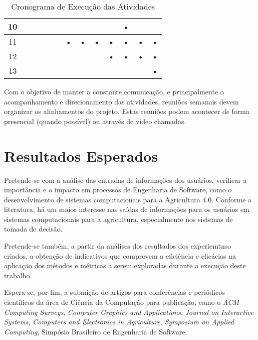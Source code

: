 \documentclass[12pt]{article}
\begin{document}
\begin{table}[htbp]
\begin{tabular}{|c|c|c|c|c|c|c|c|c|c|c|c|c|}
	10                  &            &            &           &            &            &           &            &            &           & •          &            &           \\ \hline
	11                  &            &            &           &            &            & •         & •          & •          & •         & •          & •          & •         \\ \hline
	12                  &            &            &           &            &            &           &            &            & •         & •          & •          & •         \\ \hline
	13                  &            &            &           &            &            &           &            &            &           &            &            & •         \\ \hline
	\end{tabular}
	\caption{Cronograma de Execução das Atividades}
	\label{tab:cronograma}
\end{table}

Com o objetivo de manter a constante comunicação, e principalmente o acompanhamento e direcionamento das atividades, reuniões semanais devem organizar os alinhamentos do projeto. Estas reuniões podem acontecer de forma presencial (quando possível) ou através de video chamadas.

\section{Resultados Esperados}

Pretende-se com a análise das entradas de informações dos usuários, verificar a importância e o impacto em processos de Engenharia de Software, como o desenvolvimento de sistemas computacionais para a Agricultura 4.0. Conforme a literatura, há um maior interesse nas saídas de informações para os usuários em sistemas computacionais para a agricultura, especialmente nos sistemas de tomada de decisão.

Pretende-se também, a partir da análises dos resultados dos experiemtnso criados, a obtenção de indicativos que comprovem a eficiência e eficácias na aplicação dos métodos e métricas a serem exploradas durante a execução deste trabalho.

Espera-se, por fim, a submição de artigos para conferências e periódicos científicos da área de Ciência da Computação para publicação, como o \textit{ACM Computing Surveys}, \textit{Computer Graphics and Applications}, \textit{Journal on Interactive Systems}, \textit{Computers and Electronics in Agriculture}, \textit{Symposium on Applied Computing}, Simpósio Brasileiro de Engenharia de Software. 



\end{document}
